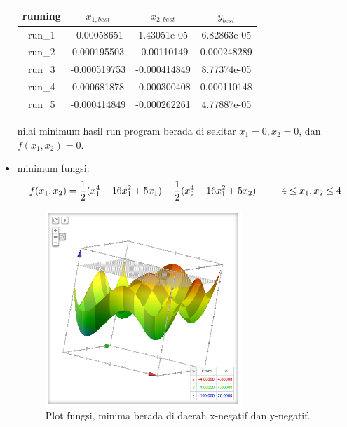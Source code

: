 \documentclass[paper=a4, fontsize=11pt]{scrartcl}
\numberwithin{equation}{section} %
\numberwithin{figure}{section} %
\numberwithin{table}{section} %
\begin{document}
\begin{itemize}
\begin{table}[ht]
\center
\begin{tabular}{c c c c}
\hline
running & $x_{1,best}$ & $x_{2,best}$ & $y_{best}$ \\ [0.5ex]
\hline 
run\_1 & -0.00058651 & 1.43051e-05  & 6.82863e-05 \\
run\_2 & 0.000195503 & -0.00110149  & 0.000248289 \\
run\_3 & -0.000519753 & -0.000414849  & 8.77374e-05 \\
run\_4 & 0.000681878 & -0.000300408  & 0.000110148 \\
run\_5 & -0.000414849 & -0.000262261 & 4.77887e-05 \\ [1ex]
\hline 
\end{tabular}
\end{table}
nilai minimum hasil run program berada di sekitar $x_{1} = 0, x_{2} = 0$, dan $f(x_{1},x_{2}) = 0$.


\vspace{1.5cm}
\item minimum fungsi:
\begin{equation*}
f(x_{1}, x_{2}) = \frac{1}{2}(x_{1}^{4} - 16x_{1}^{2} + 5x_{1}) + \frac{1}{2}(x_{2}^{4} - 16x_{1}^{2} + 5x_{2}) \hspace{0.5cm} -4 \leq x_{1}, x_{2} \leq 4
\end{equation*}
\begin{figure}
	\centering
	\includegraphics[width=0.7\textwidth]{kurva4.png}
	\caption{Plot fungsi, minima berada di daerah x-negatif dan y-negatif.}
\end{figure}


\end{itemize}
\end{document}

